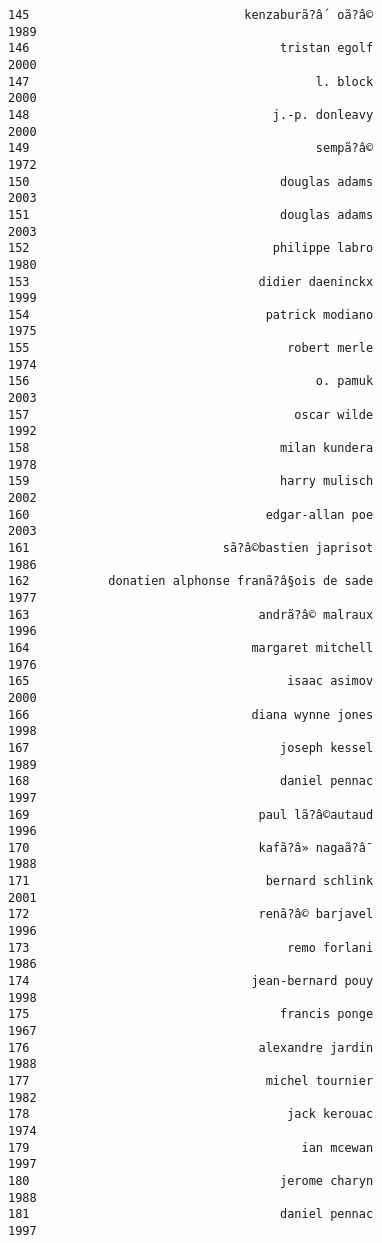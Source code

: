 \documentclass[
]{report}
\begin{document}
\begin{verbatim}
145                              kenzaburã?â´ oã?â©                1989
146                                   tristan egolf                2000
147                                        l. block                2000
148                                  j.-p. donleavy                2000
149                                        sempã?â©                1972
150                                   douglas adams                2003
151                                   douglas adams                2003
152                                  philippe labro                1980
153                                didier daeninckx                1999
154                                 patrick modiano                1975
155                                    robert merle                1974
156                                        o. pamuk                2003
157                                     oscar wilde                1992
158                                   milan kundera                1978
159                                   harry mulisch                2002
160                                 edgar-allan poe                2003
161                           sã?â©bastien japrisot                1986
162           donatien alphonse franã?â§ois de sade                1977
163                                andrã?â© malraux                1996
164                               margaret mitchell                1976
165                                    isaac asimov                2000
166                               diana wynne jones                1998
167                                   joseph kessel                1989
168                                   daniel pennac                1997
169                                paul lã?â©autaud                1996
170                                kafã?â» nagaã?â¯                1988
171                                 bernard schlink                2001
172                                renã?â© barjavel                1996
173                                    remo forlani                1986
174                               jean-bernard pouy                1998
175                                   francis ponge                1967
176                                alexandre jardin                1988
177                                 michel tournier                1982
178                                    jack kerouac                1974
179                                      ian mcewan                1997
180                                   jerome charyn                1988
181                                   daniel pennac                1997

\end{verbatim}
\end{document}
